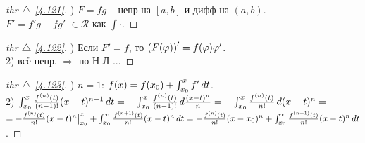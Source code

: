 
\begin{minipage}[t]{0.45\textwidth}
\begin{proof}[
thr $\triangle$
\eqref{4.121}]

\phantom{42}

) $F = fg$ -- непр на $[a, b]$ и дифф на $(a, b)$. \\
$F' = f'g + f g'$ $\in \mathcal R$ как $\int \cdot$. 
\end{proof}
\end{minipage}
\hfill
\begin{minipage}[t]{0.45\textwidth}
\begin{proof}[
thr $\triangle$
\eqref{4.122}]

\phantom{42}

) Если $F' = f$, то $\left(F(\varphi)\right)'=f(\varphi) \varphi'$. \\
2) всё непр. $\Rightarrow$ по Н-Л ...
\end{proof}
\end{minipage}

\phantom{42}

\begin{minipage}[t]{0.9\textwidth}
\begin{proof}[
thr $\triangle$
\eqref{4.123}]

\phantom{42}

) $n=1$: $f(x) = f(x_0) + \int_{x_0}^{x} f' \, d t$. \\
2) $\int_{x_0}^x \frac{f^{(n)} (t)}{(n-1)!} (x-t)^{n-1} \, d t = 
- \int_{x_0}^{x} \frac{f^{(n)}(t)}{(n-1)!} \, d \frac{(x-t)^n}{n} 
=- \int_{x_0}^{x} \frac{f^{(n)}(t)}{n!} \, d (x-t)^n =$ \\
$= - \frac{f^{(n)}(t)}{n!} (x-t)^n \big|_{x_0}^x + \int_{x_0}^x \frac{f^{(n+1)}(t)}{n!} (x-t)^n \, d t = - \frac{f^{(n)}(t)}{n!} (x-x_0)^n + \int_{x_0}^x \frac{f^{(n+1)}(t)}{n!} (x-t)^n \, d t$.
\end{proof}
\end{minipage}